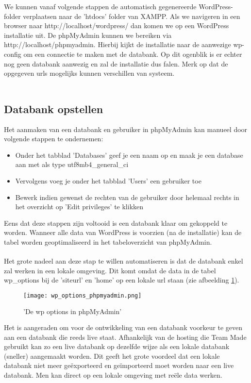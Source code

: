 We kunnen vanaf volgende stappen de automatisch gegenereerde WordPress-folder verplaatsen naar de 'htdocs' folder van XAMPP. Als we navigeren in een browser naar http://localhost/wordpress/ dan komen we op een WordPress installatie uit. De phpMyAdmin kunnen we bereiken via http://localhost/phpmyadmin. Hierbij kijkt de installatie naar de aanwezige wp-config om een connectie te maken met de databank. Op dit ogenblik is er echter nog geen databank aanwezig en zal de installatie dus falen. Merk op dat de opgegeven urls mogelijks kunnen verschillen van systeem.
\\\\
\label{aanmaken_database_script}\subsection{Databank opstellen}
Het aanmaken van een databank en gebruiker in phpMyAdmin kan manueel door volgende stappen te ondernemen:
\begin{itemize}
    \item Onder het tabblad 'Databases' geef je een naam op en maak je een database aan met als type utf8mb4\_general\_ci
    \item Vervolgens voeg je onder het tabblad 'Users' een gebruiker toe
    \item Bewerk indien gewenst de rechten van de gebruiker door helemaal rechts in het overzicht op 'Edit privileges' te klikken
\end{itemize}
Eens dat deze stappen zijn voltooid is een databank klaar om gekoppeld te worden. Wanneer alle data van WordPress is voorzien (na de installatie) kan de tabel worden geoptimaliseerd in het tabeloverzicht van phpMyAdmin.
\\\\
Het grote nadeel aan deze stap te willen automatiseren is dat de databank enkel zal werken in een lokale omgeving. Dit komt omdat de data in de tabel wp\_options bij de 'siteurl' en 'home' op een lokale url staan (zie afbeelding \ref{wp_options_phpmyadmin}). 
\begin{figure}
    \caption{'De wp options in phpMyAdmin'}
    \label{wp_options_phpmyadmin}
    \centering
    \texttt{[image: wp\_options\_phpmyadmin.png]}
\end{figure}Het is aangeraden om voor de ontwikkeling van een databank voorkeur te geven aan een databank die reeds live staat. Afhankelijk van de hosting die Team Made gebruikt kan zo een live databank op dezelfde wijze als een lokale databank (sneller) aangemaakt worden. Dit geeft het grote voordeel dat een lokale databank niet meer geëxporteerd en geïmporteerd moet worden naar een live databank. Men kan direct op een lokale omgeving met reële data werken.
